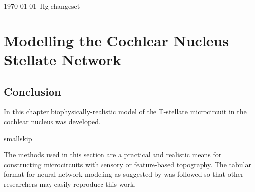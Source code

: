 \documentclass[11pt,a4paper,twoside,openright]{book}
\begin{document}

		{%
			\singlespacing%
			\tableofcontents%
                        \printglossaries
		   \clearpage%
		}%

{\today\ Hg changeset }

\setcounter{chapter}{2}
\chapter[Simple Responses]{Modelling the Cochlear Nucleus Stellate Network}
\label{sec:SimpleResponsesChapter}




\newpage


\newpage


\newpage



% 

\newpage


\section{Conclusion}

In this chapter biophysically-realistic model of the
T-stellate microcircuit in the cochlear nucleus was developed.

smallskip{}

The methods used in this section are a practical and realistic means
for constructing microcircuits with sensory or feature-based
topography.  The tabular format for neural network modeling as
suggested by \citet{NordlieGewaltigEtAl:2009} was followed so that other
researchers may easily reproduce this work. 


\appendix


 

\newpage
\listoftodos
\end{document}
